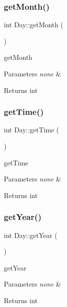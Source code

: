 \subsubsection{\texorpdfstring{get\+Month()}{getMonth()}}
{\footnotesize\ttfamily int Day\+::get\+Month (\begin{DoxyParamCaption}{ }\end{DoxyParamCaption})}

get\+Month 
\begin{DoxyParams}{Parameters}
{\em none} & \\
\hline
\end{DoxyParams}
\begin{DoxyReturn}{Returns}
int 
\end{DoxyReturn}
\mbox{\label{class_day_a1148b6b0d02ac4018028330be5c5a5dd}} 
\subsubsection{\texorpdfstring{get\+Time()}{getTime()}}
{\footnotesize\ttfamily int Day\+::get\+Time (\begin{DoxyParamCaption}{ }\end{DoxyParamCaption})}

get\+Time 
\begin{DoxyParams}{Parameters}
{\em none} & \\
\hline
\end{DoxyParams}
\begin{DoxyReturn}{Returns}
int 
\end{DoxyReturn}
\mbox{\label{class_day_acec9a2c25c4e19fa6f46cd2671dfa51d}} 
\subsubsection{\texorpdfstring{get\+Year()}{getYear()}}
{\footnotesize\ttfamily int Day\+::get\+Year (\begin{DoxyParamCaption}{ }\end{DoxyParamCaption})}

get\+Year 
\begin{DoxyParams}{Parameters}
{\em none} & \\
\hline
\end{DoxyParams}
\begin{DoxyReturn}{Returns}
int 
\end{DoxyReturn}
\mbox{\label{class_day_a66f521d19fb66b83c99b659c529d152e}} 

